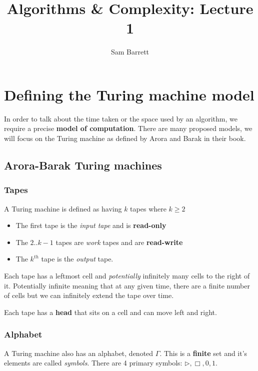 \documentclass{article}
\title{Algorithms \& Complexity: Lecture 1}
\author{Sam Barrett}
\begin{document}
\maketitle

\section{Defining the Turing machine model}
\label{sec:definition}

In order to talk about the time taken or the space used by an algorithm, we require a precise \textbf{model of computation}. There are many proposed models, we will focus on the Turing machine as defined by Arora and Barak in their book.

\subsection{Arora-Barak Turing machines}

\subsubsection{Tapes}

A Turing machine is defined as having $k$ tapes where $k \geq 2$

\begin{itemize}
  \item The first tape is the \textit{input tape} and is \textbf{read-only}
  \item The $2..k-1$ tapes are \textit{work } tapes and are \textbf{read-write}
  \item The $k^{th}$ tape is the \textit{output} tape.
\end{itemize}

Each tape has a leftmost cell and \textit{potentially} infinitely many cells to the right of it. Potentially infinite meaning that at any given time, there are a finite number of cells but we can infinitely extend the tape over time.

Each tape has a \textbf{head} that sits on a cell and can move left and right.

\subsubsection{Alphabet}

A Turing machine also has an alphabet, denoted $\Gamma $. This is a \textbf{finite} set and it's elements are called \textit{symbols}. There are 4 primary symbols: $\rhd, \Box, 0, 1 $.
\end{document}

